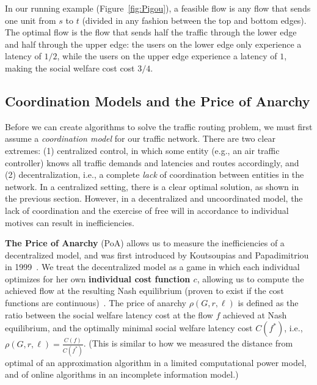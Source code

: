 In our running example (Figure~\ref{fig:Pigou}), a feasible flow is any flow that sends one unit from $s$ to $t$ (divided in any fashion between the top and bottom edges).
The optimal flow is the flow that sends half the traffic through the lower edge and half through the upper edge: the users on the lower edge only experience a latency of $1/2$, while the users on the upper edge experience a latency of $1$, making the social welfare cost cost $3/4$.

\subsection{Coordination Models and the Price of Anarchy}
Before we can create algorithms to solve the traffic routing problem, we must first assume a \emph{coordination model} for our traffic network.
There are two clear extremes: (1) centralized control, in which some entity (e.g., an air traffic controller) knows all traffic demands and latencies and routes accordingly, and
(2) decentralization, i.e., a complete \emph{lack} of coordination between
entities in the network.
In a centralized setting, there is a clear optimal solution, as shown in the previous section.
However, in a decentralized and uncoordinated model, the lack of coordination and the exercise of free will in accordance to individual motives can result in
inefficiencies. 

\medskip
\textbf{The Price of Anarchy} (PoA) allows us to measure the inefficiencies of a decentralized model, and was first introduced by Koutsoupias and Papadimitriou in 1999~\cite{poa}. 
We treat the decentralized model as a game in which each individual optimizes for her own \textbf{individual cost function $c$}, allowing us to compute the achieved flow at the resulting Nash equilibrium (proven to exist if the cost functions are continuous)~\cite{wardrop,haurie,beckmann1956studies}.
The price of anarchy $\rho(G,r,\ell)$ is defined as the ratio between the social welfare latency cost at the flow $f$ achieved at Nash equilibrium, and the optimally minimal social welfare latency cost $C(f^*)$, i.e., $\rho(G,r,\ell) =\frac{C(f)}{C(f^*)}$.
(This is similar to how we measured the distance from optimal of an approximation algorithm in a limited computational power model, and of online algorithms in an incomplete information model.)

